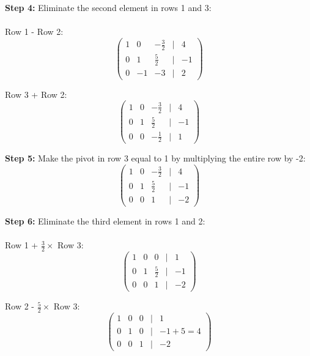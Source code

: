 \textbf{Step 4:} Eliminate the second element in rows 1 and 3:
\\\\
Row 1 - Row 2:
\begin{equation*}
\begin{pmatrix}
1 & 0 & -\frac{3}{2} & | & 4 \\
0 & 1 & \frac{5}{2} & | & -1 \\
0 & -1 & -3 & | & 2
\end{pmatrix}
\end{equation*}

Row 3 + Row 2:
\begin{equation*}
\begin{pmatrix}
1 & 0 & -\frac{3}{2} & | & 4 \\
0 & 1 & \frac{5}{2} & | & -1 \\
0 & 0 & -\frac{1}{2} & | & 1
\end{pmatrix}
\end{equation*}

\textbf{Step 5:} Make the pivot in row 3 equal to 1 by multiplying the entire row by -2:
\begin{equation*}
\begin{pmatrix}
1 & 0 & -\frac{3}{2} & | & 4 \\
0 & 1 & \frac{5}{2} & | & -1 \\
0 & 0 & 1 & | & -2
\end{pmatrix}
\end{equation*}

\textbf{Step 6:} Eliminate the third element in rows 1 and 2:
\\\\
Row 1 + \(\frac{3}{2} \times\) Row 3:
\begin{equation*}
\begin{pmatrix}
1 & 0 & 0 & | & 1 \\
0 & 1 & \frac{5}{2} & | & -1 \\
0 & 0 & 1 & | & -2
\end{pmatrix}
\end{equation*}

Row 2 - \(\frac{5}{2} \times\) Row 3:
\begin{equation*}
\begin{pmatrix}
1 & 0 & 0 & | & 1 \\
0 & 1 & 0 & | & -1 + 5 = 4 \\
0 & 0 & 1 & | & -2
\end{pmatrix}
\end{equation*}

